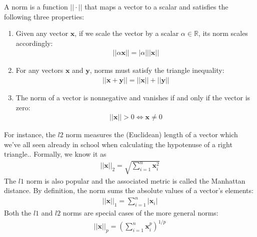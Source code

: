 \documentclass[a4paper,12pt]{article}
\theoremstyle{definition}
\newcommand{\R}{\mathbb{R}}
\begin{document}
A norm is a function $||\cdot||$ that maps a vector to a scalar and satisfies the following three properties:
\begin{enumerate}
    \item Given any vector $\mathbf{x}$, if we scale the vector by a scalar $\alpha \in \R$, its norm scales accordingly:
          \begin{equation*}
              \begin{aligned}
                  ||\alpha\mathbf{x}|| = |\alpha|||\mathbf{x}||
              \end{aligned}
          \end{equation*}
    \item For any vectors $\mathbf{x}$ and $\mathbf{y}$, norms must satisfy the triangle inequality:
          \begin{equation*}
              \begin{aligned}
                  ||\mathbf{x} + \mathbf{y}|| = ||\mathbf{x}|| + ||\mathbf{y}||
              \end{aligned}
          \end{equation*}
    \item The norm of a vector is nonnegative and vanishes if and only if the vector is zero:
          \begin{equation*}
              \begin{aligned}
                  ||\mathbf{x}|| > 0 \iff \mathbf{x} \neq 0
              \end{aligned}
          \end{equation*}
\end{enumerate}
For instance, the $l2$ norm measures the (Euclidean) length of a vector which we've all seen already in school when calculating the hypotenuse of a right triangle..
Formally, we know it as
\begin{equation*}
    \begin{aligned}
        ||\mathbf{x}||_2 = \sqrt{\sum_{i=1}^{n}\mathbf{x}_i^2}
    \end{aligned}
\end{equation*}
The $l1$ norm is also popular and the associated metric is called the Manhattan distance. By definition, the
norm sums the absolute values of a vector's elements:
\begin{equation*}
    \begin{aligned}
        ||\mathbf{x}||_1 = \sum_{i=1}^{n}|\mathbf{x}_i|
    \end{aligned}
\end{equation*}
Both the $l1$ and $l2$ norms are special cases of the more general norms:
\begin{equation}
    \begin{aligned}
        ||\mathbf{x}||_p = \left({\sum_{i=1}^{n}\mathbf{x}_i^p}\right)^{1/p}
    \end{aligned}
\end{equation}
\end{document}
